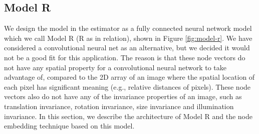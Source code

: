 \documentclass[12pt]{WSUThesis}
\theoremstyle{definition}
\begin{document}
\subsection{Model R}
We design the model in the estimator as a fully connected neural network model which we call Model R (R as in relation), shown in Figure \ref{fig:model-r}.
We have considered a convolutional neural net as an alternative,
but we decided it would not be a good fit for this application.
The reason is that these node vectors do not have any spatial property
for a convolutional neural network to take advantage of,
compared to the 2D array of an image where the spatial location of each pixel
has significant meaning (e.g., relative distances of pixels).
These node vectors also do not have any of the invariance properties of an image,
such as translation invariance, rotation invariance,
size invariance and illumination invariance.
In this section, we describe the architecture of Model R and the node embedding technique based on this model.
\end{document}
